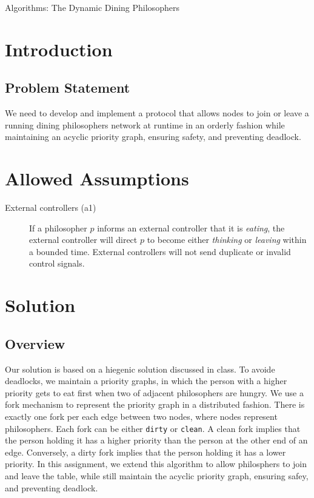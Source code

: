\documentclass[11pt]{article}
\begin{document}
\pagestyle{fancy}


\begin{center} \Large Algorithms: The Dynamic Dining Philosophers \end{center}

\section{Introduction}


\subsection{Problem Statement}
We need to develop and implement a protocol that allows nodes to join or leave a running dining philosophers network at runtime in an orderly fashion while maintaining an acyclic priority graph, ensuring safety, and preventing deadlock.



\section{Allowed Assumptions}

\begin{description}
\item[External controllers (a1)]
If a philosopher $p$ informs an external controller that it is \emph{eating}, the external controller will direct $p$ to become either \emph{thinking} or \emph{leaving} within a bounded time.
External controllers will not send duplicate or invalid control signals.
\end{description}

\section{Solution}
\subsection{Overview}
Our solution is based on a hiegenic solution discussed in class.
To avoide deadlocks, we maintain a priority graphs, in which the person
with a higher priority gets to eat first when two of adjacent philosophers are hungry. We use a fork mechanism to represent the priority graph in a distributed fashion. There is exactly one fork per each edge between two nodes,
where nodes represent philosophers. Each fork can be either \texttt{dirty} or \texttt{clean}. A clean fork implies that the person holding it has a higher priority
than the person at the other end of an edge. Conversely, a dirty fork implies that the person holding it has a lower priority. In this assignment, we extend this algorithm to allow philosphers to join and leave the table, while still maintain the acyclic priority graph, ensuring safey, and preventing deadlock.
\end{document}
